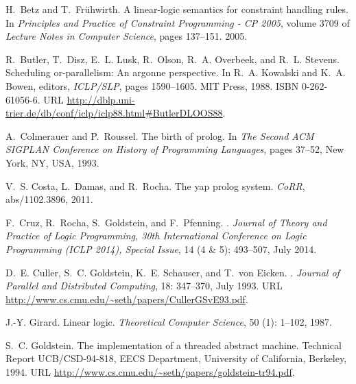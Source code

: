 \documentclass{sigplanconf}
\begin{document}
\begin{thebibliography}{35}
H.~Betz and T.~Fr{\"u}hwirth.
\newblock A linear-logic semantics for constraint handling rules.
\newblock In \emph{Principles and Practice of Constraint Programming - CP
  2005}, volume 3709 of \emph{Lecture Notes in Computer Science}, pages
  137--151. 2005.

R.~Butler, T.~Disz, E.~L. Lusk, R.~Olson, R.~A. Overbeek, and R.~L. Stevens.
\newblock Scheduling or-parallelism: An argonne perspective.
\newblock In R.~A. Kowalski and K.~A. Bowen, editors, \emph{ICLP/SLP}, pages
  1590--1605. MIT Press, 1988.
\newblock ISBN 0-262-61056-6.
\newblock URL
  \url{http://dblp.uni-trier.de/db/conf/iclp/iclp88.html#ButlerDLOOS88}.

A.~Colmerauer and P.~Roussel.
\newblock The birth of prolog.
\newblock In \emph{The Second ACM SIGPLAN Conference on History of Programming
  Languages}, pages 37--52, New York, NY, USA, 1993.

V.~S. Costa, L.~Damas, and R.~Rocha.
\newblock The yap prolog system.
\newblock \emph{CoRR}, abs/1102.3896, 2011.

F.~Cruz, R.~Rocha, S.~Goldstein, and F.~Pfenning.
.
\newblock \emph{Journal of Theory and Practice of Logic Programming, 30th
  International Conference on Logic Programming (ICLP 2014), Special Issue},
  14 (4 \& 5): 493--507, July 2014.

D.~E. Culler, S.~C. Goldstein, K.~E. Schauser, and T.~von Eicken.
.
\newblock \emph{Journal of Parallel and Distributed Computing}, 18:
  347--370, July 1993.
\newblock URL \url{http://www.cs.cmu.edu/~seth/papers/CullerGSvE93.pdf}.

J.-Y. Girard.
\newblock Linear logic.
\newblock \emph{Theoretical Computer Science}, 50 (1):
  1--102, 1987.

S.~C. Goldstein.
\newblock The implementation of a threaded abstract machine.
\newblock Technical Report UCB/CSD-94-818, EECS Department, University of
  California, Berkeley, 1994.
\newblock URL \url{http://www.cs.cmu.edu/~seth/papers/goldstein-tr94.pdf}.


\end{thebibliography}
\end{document}
